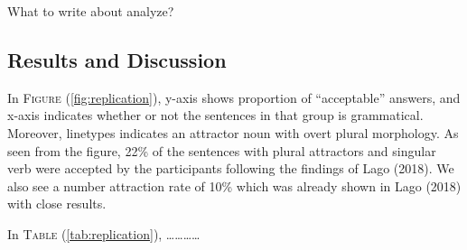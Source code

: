 \documentclass[11pt,a4paper]{article}
\begin{document}
What to write about analyze?

\hypertarget{results-and-discussion}{%
\subsection{Results and Discussion}\label{results-and-discussion}}

In \textsc{Figure} (\ref{fig:replication}), y-axis shows proportion of
``acceptable'' answers, and x-axis indicates whether or not the
sentences in that group is grammatical. Moreover, linetypes indicates an
attractor noun with overt plural morphology. As seen from the figure,
22\% of the sentences with plural attractors and singular verb were
accepted by the participants following the findings of Lago (2018). We
also see a number attraction rate of 10\% which was already shown in
Lago (2018) with close results.

In \textsc{Table} (\ref{tab:replication}),
\ldots{}\ldots{}\ldots{}\ldots{}
\end{document}
